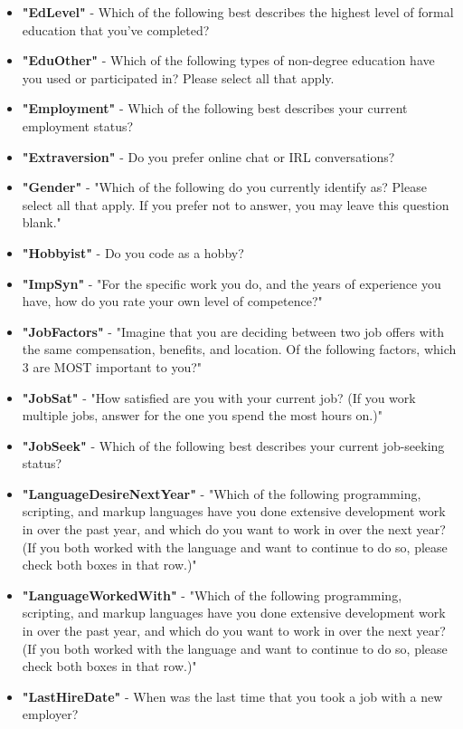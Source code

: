 \begin{appendices}
\begin{itemize}
        \item \textbf{"EdLevel"} - Which of the following best describes the highest level of formal education that you’ve completed?
        \item \textbf{"EduOther"} - Which of the following types of non-degree education have you used or participated in? Please select all that apply.
        \item \textbf{"Employment"} - Which of the following best describes your current employment status?
        \item \textbf{"Extraversion"} - Do you prefer online chat or IRL conversations?
        \item \textbf{"Gender"} - "Which of the following do you currently identify as? Please select all that apply. If you prefer not to answer, you may leave this question blank."
        \item \textbf{"Hobbyist"} - Do you code as a hobby?
        \item \textbf{"ImpSyn"} - "For the specific work you do, and the years of experience you have, how do you rate your own level of competence?"
        \item \textbf{"JobFactors"} - "Imagine that you are deciding between two job offers with the same compensation, benefits, and location. Of the following factors, which 3 are MOST important to you?"
        \item \textbf{"JobSat"} - "How satisfied are you with your current job? (If you work multiple jobs, answer for the one you spend the most hours on.)"
        \item \textbf{"JobSeek"} - Which of the following best describes your current job-seeking status?
        \item \textbf{"LanguageDesireNextYear"} - "Which of the following programming, scripting, and markup languages have you done extensive development work in over the past year, and which do you want to work in over the next year?  (If you both worked with the language and want to continue to do so, please check both boxes in that row.)"
        \item \textbf{"LanguageWorkedWith"} - "Which of the following programming, scripting, and markup languages have you done extensive development work in over the past year, and which do you want to work in over the next year?  (If you both worked with the language and want to continue to do so, please check both boxes in that row.)"
        \item \textbf{"LastHireDate"} - When was the last time that you took a job with a new employer?

\end{itemize}
\end{appendices}
